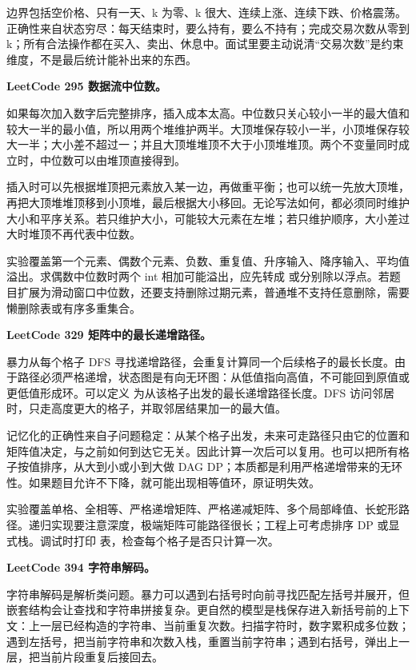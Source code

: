 边界包括空价格、只有一天、k 为零、k 很大、连续上涨、连续下跌、价格震荡。正确性来自状态穷尽：每天结束时，要么持有，要么不持有；完成交易次数从零到 k；所有合法操作都在买入、卖出、休息中。面试里要主动说清“交易次数”是约束维度，不是最后统计能补出来的东西。

\noindent\textbf{LeetCode 295 数据流中位数。}

如果每次加入数字后完整排序，插入成本太高。中位数只关心较小一半的最大值和较大一半的最小值，所以用两个堆维护两半。大顶堆保存较小一半，小顶堆保存较大一半；大小差不超过一；并且大顶堆堆顶不大于小顶堆堆顶。两个不变量同时成立时，中位数可以由堆顶直接得到。

插入时可以先根据堆顶把元素放入某一边，再做重平衡；也可以统一先放大顶堆，再把大顶堆堆顶移到小顶堆，最后根据大小移回。无论写法如何，都必须同时维护大小和平序关系。若只维护大小，可能较大元素在左堆；若只维护顺序，大小差过大时堆顶不再代表中位数。

实验覆盖第一个元素、偶数个元素、负数、重复值、升序输入、降序输入、平均值溢出。求偶数中位数时两个 int 相加可能溢出，应先转成  或分别除以浮点。若题目扩展为滑动窗口中位数，还要支持删除过期元素，普通堆不支持任意删除，需要懒删除表或有序多重集合。

\noindent\textbf{LeetCode 329 矩阵中的最长递增路径。}

暴力从每个格子 DFS 寻找递增路径，会重复计算同一个后续格子的最长长度。由于路径必须严格递增，状态图是有向无环图：从低值指向高值，不可能回到原值或更低值形成环。可以定义  为从该格子出发的最长递增路径长度。DFS 访问邻居时，只走高度更大的格子，并取邻居结果加一的最大值。

记忆化的正确性来自子问题稳定：从某个格子出发，未来可走路径只由它的位置和矩阵值决定，与之前如何到达它无关。因此计算一次后可以复用。也可以把所有格子按值排序，从大到小或小到大做 DAG DP；本质都是利用严格递增带来的无环性。如果题目允许不下降，就可能出现相等值环，原证明失效。

实验覆盖单格、全相等、严格递增矩阵、严格递减矩阵、多个局部峰值、长蛇形路径。递归实现要注意深度，极端矩阵可能路径很长；工程上可考虑排序 DP 或显式栈。调试时打印  表，检查每个格子是否只计算一次。

\noindent\textbf{LeetCode 394 字符串解码。}

字符串解码是解析类问题。暴力可以遇到右括号时向前寻找匹配左括号并展开，但嵌套结构会让查找和字符串拼接复杂。更自然的模型是栈保存进入新括号前的上下文：上一层已经构造的字符串、当前重复次数。扫描字符时，数字累积成多位数；遇到左括号，把当前字符串和次数入栈，重置当前字符串；遇到右括号，弹出上一层，把当前片段重复后接回去。

